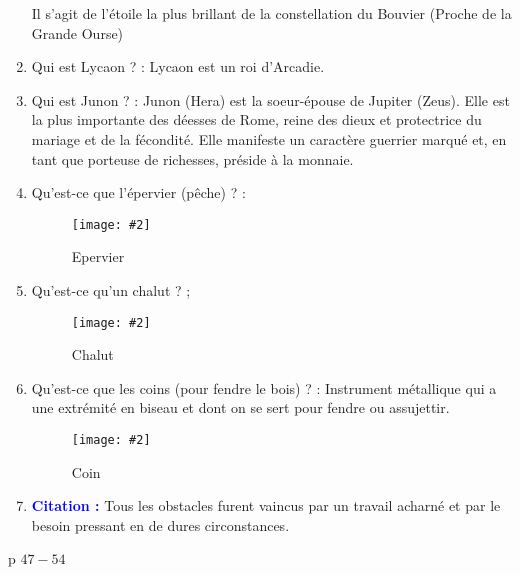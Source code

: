\documentclass[a4paper, 11pt, hidelinks]{article}
\newcommand{\cit}{\textcolor{blue}{\textbf{Citation : }}}
\newcommand{\img}[4]{\begin{figure}[!ht]
    \centering
    \texttt{[image: \#2]}
    \caption{#3}
    \label{#4}
    \end{figure} }
\begin{document}
\begin{enumerate}
            Il s'agit de l'étoile la plus brillant de la constellation du Bouvier (Proche de la Grande Ourse)
      \item Qui est Lycaon ? : Lycaon est un roi d'Arcadie.
      \item Qui est Junon ? : Junon (Hera) est la soeur-épouse de Jupiter (Zeus). Elle est la plus importante des déesses de Rome,
            reine des dieux et protectrice du mariage et de la fécondité. Elle manifeste un caractère guerrier marqué et, en tant que
            porteuse de richesses, préside à la monnaie.
      \item Qu'est-ce que l'épervier (pêche) ? : \img{0.4}{Epervier.jpg}{Epervier}{23}
      \item Qu'est-ce qu'un chalut ? ; \img{0.3}{Chalut.jpg}{Chalut}{24}
            \newpage
      \item Qu'est-ce que les coins (pour fendre le bois) ? : Instrument métallique qui a une extrémité en biseau et dont on se sert pour fendre ou assujettir.
            \img{0.5}{Coin.jpg}{Coin}{25}
      \item \cit Tous les obstacles furent vaincus par un travail acharné et par le besoin pressant en de dures circonstances.
\end{enumerate}


p $47 - 54$
\end{document}
